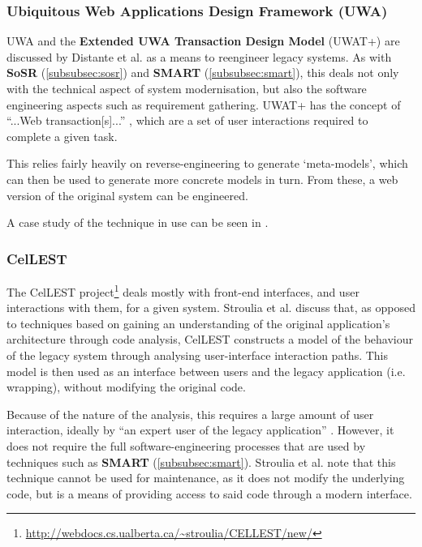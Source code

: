 \documentclass[12pt,journal,compsoc]{IEEEtran}
\begin{document}
\subsubsection{Ubiquitous Web Applications Design Framework (UWA)}
\label{subsubsec:uwa}
UWA \cite{UWAConsortium2002} and the \textbf{Extended UWA Transaction Design Model} (UWAT+) \cite{Distante2005} are discussed by Distante et al. \cite{Distante2006} as a means to reengineer legacy systems. As with \textbf{SoSR} (\autoref{subsubsec:sosr}) and \textbf{SMART} (\autoref{subsubsec:smart}), this deals not only with the technical aspect of system modernisation, but also the software engineering aspects such as requirement gathering. UWAT+ has the concept of ``...Web transaction[s]...'' \cite{Distante2006}, which are a set of user interactions required to complete a given task.

This relies fairly heavily on reverse-engineering to generate `meta-models', which can then be used to generate more concrete models in turn. From these, a web version of the original system can be engineered.

A case study of the technique in use can be seen in \cite{Distante:2006:RLA:1134285.1134353}.

\subsubsection{CelLEST}
\label{subsubsec:cellest}
The CelLEST project\footnote{\url{http://webdocs.cs.ualberta.ca/~stroulia/CELLEST/new/}} deals mostly with front-end interfaces, and user interactions with them, for a given system. Stroulia et al. \cite{Stroulia2002} discuss that, as opposed to techniques based on gaining an understanding of the original application's architecture through code analysis, CelLEST constructs a model of the behaviour of the legacy system through analysing user-interface interaction paths. This model is then used as an interface between users and the legacy application (i.e. wrapping), without modifying the original code.

Because of the nature of the analysis, this requires a large amount of user interaction, ideally by ``an expert user of the legacy application'' \cite{Stroulia2002}. However, it does not require the full software-engineering processes that are used by techniques such as \textbf{SMART} (\autoref{subsubsec:smart}). Stroulia et al. note that this technique cannot be used for maintenance, as it does not modify the underlying code, but is a means of providing access to said code through a modern interface.
\end{document}
